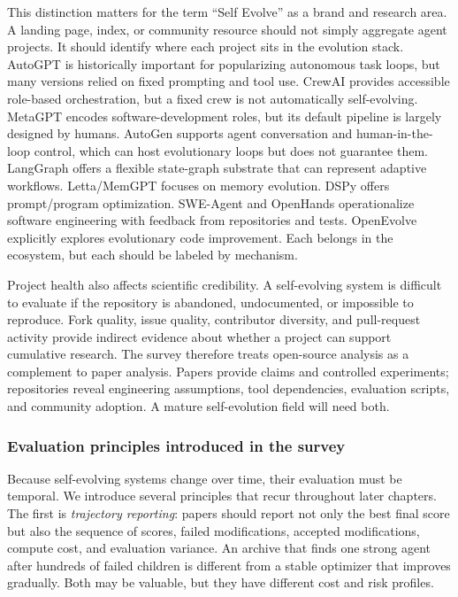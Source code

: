 This distinction matters for the term ``Self Evolve'' as a brand and research area. A landing page, index, or community resource should not simply aggregate agent projects. It should identify where each project sits in the evolution stack. AutoGPT is historically important for popularizing autonomous task loops, but many versions relied on fixed prompting and tool use. CrewAI provides accessible role-based orchestration, but a fixed crew is not automatically self-evolving. MetaGPT encodes software-development roles, but its default pipeline is largely designed by humans. AutoGen supports agent conversation and human-in-the-loop control, which can host evolutionary loops but does not guarantee them. LangGraph offers a flexible state-graph substrate that can represent adaptive workflows. Letta/MemGPT focuses on memory evolution. DSPy offers prompt/program optimization. SWE-Agent and OpenHands operationalize software engineering with feedback from repositories and tests. OpenEvolve explicitly explores evolutionary code improvement. Each belongs in the ecosystem, but each should be labeled by mechanism.

Project health also affects scientific credibility. A self-evolving system is difficult to evaluate if the repository is abandoned, undocumented, or impossible to reproduce. Fork quality, issue quality, contributor diversity, and pull-request activity provide indirect evidence about whether a project can support cumulative research. The survey therefore treats open-source analysis as a complement to paper analysis. Papers provide claims and controlled experiments; repositories reveal engineering assumptions, tool dependencies, evaluation scripts, and community adoption. A mature self-evolution field will need both.

\subsubsection{Evaluation principles introduced in the survey}

Because self-evolving systems change over time, their evaluation must be temporal. We introduce several principles that recur throughout later chapters. The first is \emph{trajectory reporting}: papers should report not only the best final score but also the sequence of scores, failed modifications, accepted modifications, compute cost, and evaluation variance. An archive that finds one strong agent after hundreds of failed children is different from a stable optimizer that improves gradually. Both may be valuable, but they have different cost and risk profiles.

